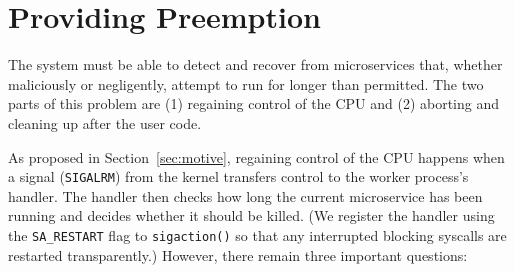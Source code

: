 \section{Providing Preemption}
\label{sec:preemption}

% 
% 



The system must be able to detect and recover from microservices that, whether
maliciously or negligently, attempt to run for longer than permitted.  The two parts
of this problem are (1) regaining control of the CPU and (2) aborting and cleaning up
after the user code.

As proposed in Section~\ref{sec:motive}, regaining control of the CPU happens when a
signal (\texttt{SIGALRM}) from the kernel transfers control to the worker process's
handler.  The handler then checks how long the current microservice has been running
and decides whether it should be killed.  (We register the handler using the
\texttt{SA\_RESTART} flag to \texttt{sigaction()} so that any interrupted blocking
syscalls are restarted transparently.)  However, there remain three important
questions:

